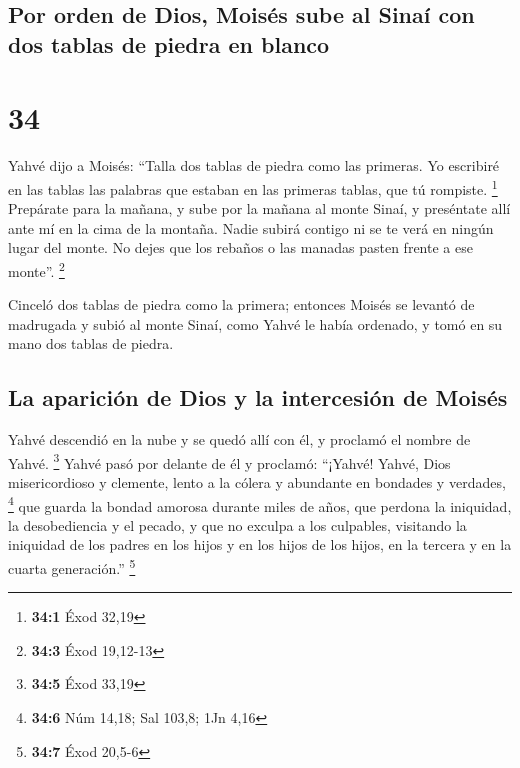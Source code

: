 \hypertarget{por-orden-de-dios-moisuxe9s-sube-al-sinauxed-con-dos-tablas-de-piedra-en-blanco}{%
\subsection{Por orden de Dios, Moisés sube al Sinaí con dos tablas de
piedra en
blanco}\label{por-orden-de-dios-moisuxe9s-sube-al-sinauxed-con-dos-tablas-de-piedra-en-blanco}}

\hypertarget{section-33}{%
\section{34}\label{section-33}}

 Yahvé dijo a Moisés: ``Talla dos tablas de piedra como
las primeras. Yo escribiré en las tablas las palabras que estaban en las
primeras tablas, que tú rompiste. \footnote{\textbf{34:1} Éxod 32,19}
 Prepárate para la mañana, y sube por la mañana al monte
Sinaí, y preséntate allí ante mí en la cima de la montaña.
 Nadie subirá contigo ni se te verá en ningún lugar del
monte. No dejes que los rebaños o las manadas pasten frente a ese
monte''. \footnote{\textbf{34:3} Éxod 19,12-13}

 Cinceló dos tablas de piedra como la primera; entonces
Moisés se levantó de madrugada y subió al monte Sinaí, como Yahvé le
había ordenado, y tomó en su mano dos tablas de piedra.

\hypertarget{la-apariciuxf3n-de-dios-y-la-intercesiuxf3n-de-moisuxe9s}{%
\subsection{La aparición de Dios y la intercesión de
Moisés}\label{la-apariciuxf3n-de-dios-y-la-intercesiuxf3n-de-moisuxe9s}}

 Yahvé descendió en la nube y se quedó allí con él, y
proclamó el nombre de Yahvé. \footnote{\textbf{34:5} Éxod 33,19}
 Yahvé pasó por delante de él y proclamó: ``¡Yahvé! Yahvé,
Dios misericordioso y clemente, lento a la cólera y abundante en
bondades y verdades, \footnote{\textbf{34:6} Núm 14,18; Sal 103,8; 1Jn
  4,16}  que guarda la bondad amorosa durante miles de
años, que perdona la iniquidad, la desobediencia y el pecado, y que no
exculpa a los culpables, visitando la iniquidad de los padres en los
hijos y en los hijos de los hijos, en la tercera y en la cuarta
generación.'' \footnote{\textbf{34:7} Éxod 20,5-6}


